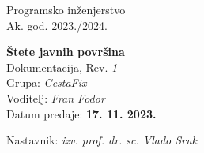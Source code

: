 \documentclass[12pt]{report}
\begin{document}
\begin{titlepage}
	\begin{center}
		\LARGE Programsko inženjerstvo\\
		\large Ak. god. 2023./2024.\\


		\huge \textbf{Štete javnih površina}\\
		\Large Dokumentacija, Rev. \textit{1}\\

		\normalsize
		Grupa: \textit{CestaFix}\\
		Voditelj: \textit{Fran Fodor}\\


		Datum predaje: \textbf{{17. 11. 2023.}}\\


		Nastavnik: \textit{izv. prof. dr. sc. Vlado Sruk}\\

	\end{center}


\end{titlepage}


\tableofcontents











\begingroup
\renewcommand*\listfigurename{Indeks slika i dijagrama}
\listoffigures
\endgroup
{}



\eject


\end{document}
